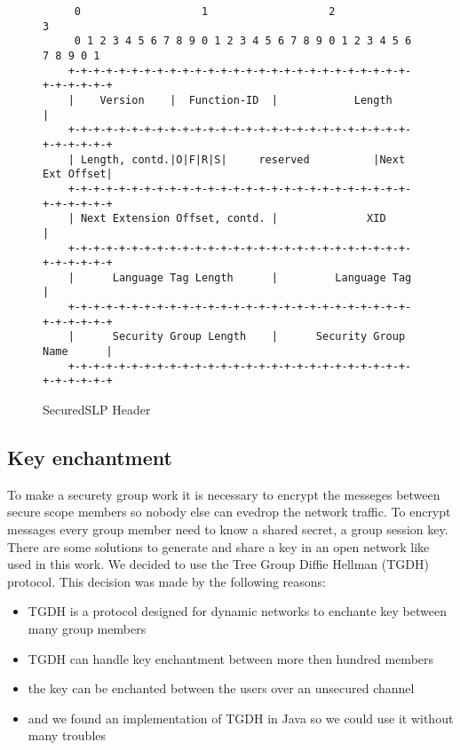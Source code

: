 \begin{figure}
\begin{lstlisting}
	 0                   1                   2                   3
	 0 1 2 3 4 5 6 7 8 9 0 1 2 3 4 5 6 7 8 9 0 1 2 3 4 5 6 7 8 9 0 1
	+-+-+-+-+-+-+-+-+-+-+-+-+-+-+-+-+-+-+-+-+-+-+-+-+-+-+-+-+-+-+-+-+
	|    Version    |  Function-ID  |            Length             |
	+-+-+-+-+-+-+-+-+-+-+-+-+-+-+-+-+-+-+-+-+-+-+-+-+-+-+-+-+-+-+-+-+
	| Length, contd.|O|F|R|S|     reserved          |Next Ext Offset|
	+-+-+-+-+-+-+-+-+-+-+-+-+-+-+-+-+-+-+-+-+-+-+-+-+-+-+-+-+-+-+-+-+
	| Next Extension Offset, contd. |              XID              |
	+-+-+-+-+-+-+-+-+-+-+-+-+-+-+-+-+-+-+-+-+-+-+-+-+-+-+-+-+-+-+-+-+
	|      Language Tag Length      |         Language Tag          |
	+-+-+-+-+-+-+-+-+-+-+-+-+-+-+-+-+-+-+-+-+-+-+-+-+-+-+-+-+-+-+-+-+
	|      Security Group Length    |      Security Group Name      |
	+-+-+-+-+-+-+-+-+-+-+-+-+-+-+-+-+-+-+-+-+-+-+-+-+-+-+-+-+-+-+-+-+
\end{lstlisting}
\label{fig:sslp-header}
\caption{SecuredSLP Header}
\end{figure}







\subsection{Key enchantment}\label{sec:keyenchange}
To make a securety group work it is necessary to encrypt the messeges between secure scope members so nobody else can evedrop the network traffic. To encrypt messages every group member need to know a shared secret, a group session key. There are some solutions to generate and share a key in an open network like used in this work. We decided to use the Tree Group Diffie Hellman (TGDH) protocol. This decision was made by the following reasons:
\begin{itemize}
  \item TGDH is a protocol designed for dynamic networks to enchante key between many group members
  \item TGDH can handle key enchantment between more then hundred members
  \item the key can be enchanted between the users over an unsecured channel
  \item and we found an implementation of TGDH in Java so we could use it without many troubles
\end{itemize}